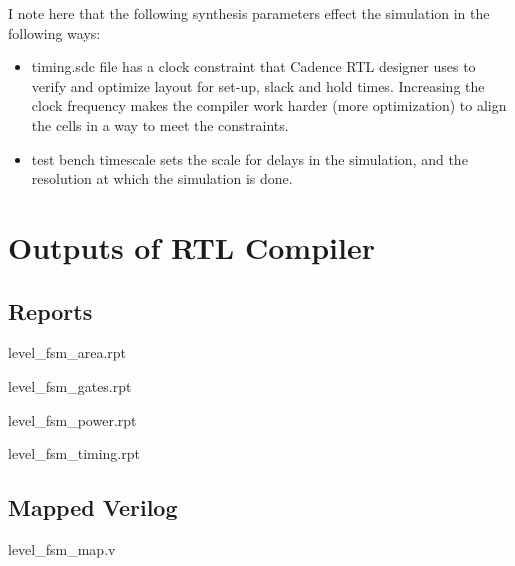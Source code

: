 \documentclass[11pt]{article}
\begin{document}
I note here that the following synthesis parameters effect the simulation in the following ways:
\begin{itemize}
  \item timing.sdc file has a clock constraint that Cadence RTL designer uses to verify and optimize layout for set-up, slack and hold times. Increasing the clock frequency makes the compiler work harder (more optimization) to align the cells in a way to meet the constraints. 
  \item test bench timescale sets the scale for delays in the simulation, and the resolution at which the simulation is done.
\end{itemize}

\section{Outputs of RTL Compiler}
\subsection{Reports}
level{\_}fsm{\_}area.rpt

level{\_}fsm{\_}gates.rpt

level{\_}fsm{\_}power.rpt

level{\_}fsm{\_}timing.rpt

\subsection{Mapped Verilog}
level{\_}fsm{\_}map.v

\end{document}
